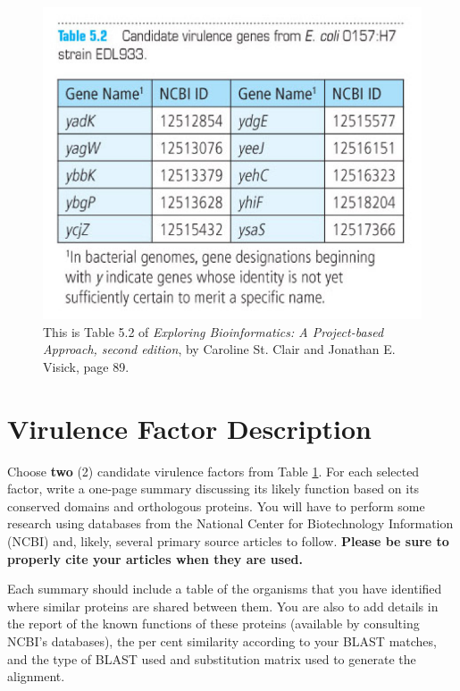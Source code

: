 \begin{figure}
\begin{center}
    \includegraphics[scale=1]{graphics/table.png}
    \caption{This is Table 5.2 of \emph{Exploring Bioinformatics: A Project-based Approach, second edition}, by Caroline St. Clair and Jonathan E. Visick, page 89.}
    \label{fig:table}
\end{center}
\end{figure}



\vspace*{-.1in}
\section*{Virulence Factor Description}
\vspace*{-.1in} 

Choose \textbf{two} (2) candidate virulence factors from Table \ref{fig:table}.  For each selected factor, write a one-page summary discussing its likely function based on its conserved domains and orthologous proteins. You will have to perform some research using databases from the National Center for Biotechnology Information (NCBI) and, likely, several primary source articles to follow. \textbf{Please be sure to properly cite your articles when they are used.}

Each summary should include a table of the organisms that you have identified where similar proteins are shared between them. You are also to add details in the report of the known functions of these proteins (available by consulting NCBI's databases), the per cent similarity according to your BLAST matches, and the type of BLAST used and substitution matrix used to generate the alignment.  

